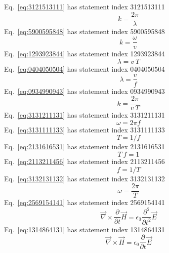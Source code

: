 \documentclass[12pt]{report}
\begin{document}
Eq.~\ref{eq:3121513111} has statement index 3121513111
\begin{equation}
k=\frac{2 \pi}{\lambda}
\label{eq:3121513111}
\end{equation}
Eq.~\ref{eq:5900595848} has statement index 5900595848
\begin{equation}
k=\frac{\omega}{v}
\label{eq:5900595848}
\end{equation}
Eq.~\ref{eq:1293923844} has statement index 1293923844
\begin{equation}
\lambda = v\ T
\label{eq:1293923844}
\end{equation}
Eq.~\ref{eq:0404050504} has statement index 0404050504
\begin{equation}
\lambda = \frac{v}{f}
\label{eq:0404050504}
\end{equation}
Eq.~\ref{eq:0934990943} has statement index 0934990943
\begin{equation}
k = \frac{2 \pi}{v\ T}
\label{eq:0934990943}
\end{equation}
Eq.~\ref{eq:3131211131} has statement index 3131211131
\begin{equation}
\omega=2 \pi f
\label{eq:3131211131}
\end{equation}
Eq.~\ref{eq:3131111133} has statement index 3131111133
\begin{equation}
T=1/f
\label{eq:3131111133}
\end{equation}
Eq.~\ref{eq:2131616531} has statement index 2131616531
\begin{equation}
T\ f=1
\label{eq:2131616531}
\end{equation}
Eq.~\ref{eq:2113211456} has statement index 2113211456
\begin{equation}
f=1/T
\label{eq:2113211456}
\end{equation}
Eq.~\ref{eq:3132131132} has statement index 3132131132
\begin{equation}
\omega=\frac{2\pi}{T}
\label{eq:3132131132}
\end{equation}
Eq.~\ref{eq:2569154141} has statement index 2569154141
\begin{equation}
\vec{\nabla} \times \frac{\partial}{\partial t}\vec{H} = \epsilon_0 \frac{\partial^2 }{\partial t^2}\vec{E}
\label{eq:2569154141}
\end{equation}
Eq.~\ref{eq:1314864131} has statement index 1314864131
\begin{equation}
\vec{\nabla} \times \vec{H} = \epsilon_0 \frac{\partial }{\partial t}\vec{E}
\label{eq:1314864131}
\end{equation}
\end{document}
